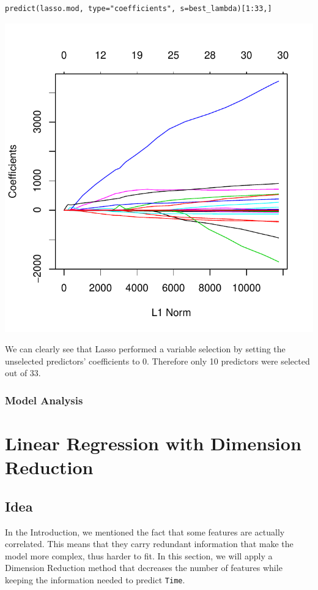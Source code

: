 \documentclass[]{report}
\begin{document}
\begin{lstlisting}
predict(lasso.mod, type="coefficients", s=best_lambda)[1:33,]
\end{lstlisting}

\begin{center}
	\includegraphics[width=0.8\linewidth]{Figures/lasso_coeff}
\end{center}

We can clearly see that Lasso performed a variable selection by setting the unselected predictors' coefficients to 0. Therefore only 10 predictors were selected out of 33.

\subsubsection{Model Analysis}

\section{Linear Regression with Dimension Reduction}
\subsection{Idea}
In the Introduction, we mentioned the fact that some features are actually correlated. This means that they carry redundant information that make the model more complex, thus harder to fit. In this section, we will apply a Dimension Reduction method that decreases the number of features while keeping the information needed to predict \texttt{Time}.
\end{document}
